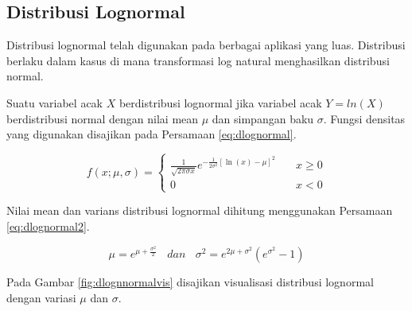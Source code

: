 \documentclass[]{book}
\begin{document}
\subsection{Distribusi Lognormal}\label{distribusi-lognormal}

Distribusi lognormal telah digunakan pada berbagai aplikasi yang luas.
Distribusi berlaku dalam kasus di mana transformasi log natural
menghasilkan distribusi normal.

Suatu variabel acak \(X\) berdistribusi lognormal jika variabel acak
\(Y=ln\left(X\right)\) berdistribusi normal dengan nilai mean \(\mu\)
dan simpangan baku \(\sigma\). Fungsi densitas yang digunakan disajikan
pada Persamaan \eqref{eq:dlognormal}.

\begin{equation}
f\left(x;\mu,\sigma \right) =
  \begin{cases}
    \frac{1}{\sqrt{2\pi\sigma x}}e^{-\frac{1}{2\sigma^2}\left[\ln\left(x\right)-\mu\right]^2}       & \quad x\ge 0\\
    0                   & \quad x<0
    \end{cases}
 \label{eq:dlognormal}
\end{equation}

Nilai mean dan varians distribusi lognormal dihitung menggunakan
Persamaan \eqref{eq:dlognormal2}.

\begin{equation}
   \mu=e^{\mu+\frac{\sigma^2}{2}}\ \ \ \ dan\ \ \ \ \sigma^2=e^{2\mu+\sigma^2}\left(e^{\sigma^2}-1\right)
  \label{eq:dlognormal2}
\end{equation}

Pada Gambar \ref{fig:dlognnormalvis} disajikan visualisasi distribusi
lognormal dengan variasi \(\mu\) dan \(\sigma\).
\end{document}
